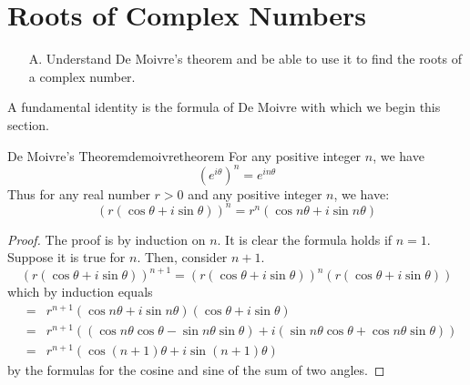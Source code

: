 \section{Roots of Complex Numbers}

\begin{outcome}
\begin{enumerate}
\item[A.] Understand De Moivre's theorem and be able to use it to find the
roots of a complex number.
\end{enumerate}
\end{outcome}

A fundamental identity is the
 formula of De Moivre with which we begin this section.

\begin{theorem}{De Moivre's Theorem}{demoivretheorem}
For any positive integer $n$, we have
\begin{equation*}
\left( e^{i \theta} \right)^n = e^{i n \theta}
\end{equation*}
Thus for any real number $r>0$ and any positive integer $n$, we have:
\begin{equation*}
\left( r\left( \cos \theta+i\sin \theta\right) \right) ^{n}=r^{n}\left( \cos n \theta +i\sin
n\theta\right) 
\end{equation*}
\end{theorem}

\begin{proof}
 The proof is by induction on $n$. It is clear the formula holds if $n=1.$ Suppose it is true
for $n.$ Then, consider $n+1$.
\begin{equation*}
\left( r\left( \cos \theta+i\sin \theta\right) \right) ^{n+1}=\left( r\left( \cos
\theta+i\sin \theta\right) \right) ^{n}\left( r\left( \cos \theta+i\sin \theta\right) \right)
\end{equation*}
which by induction equals
\begin{eqnarray*}
&=&r^{n+1}\left( \cos n\theta+i\sin n\theta\right) \left( \cos \theta+i\sin \theta\right) \\
&=& r^{n+1}\left( \left( \cos n\theta\cos \theta-\sin n\theta\sin \theta\right) +i\left( \sin
n\theta\cos \theta+\cos n\theta\sin \theta\right) \right)\\
&=&r^{n+1}\left( \cos \left( n+1\right) \theta+i\sin \left( n+1\right) \theta\right)
\end{eqnarray*}
by the formulas for the cosine and sine of the sum of two angles. 
\end{proof}

